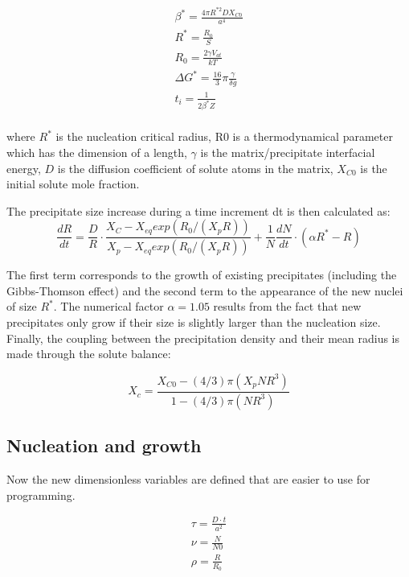 \documentclass[12pt,a4paper]{article}
\begin{document}
\begin{subequations}
	\begin{align}
\beta^* = \frac{4\pi R^{*2} D X_{C0}}{a^4} \\
R^* = \frac{R_0}{S} \\
R_0 = \frac{2\gamma V_{at}}{kT} \\
\Delta G^* = \frac{16}{3}\pi \frac{\gamma}{\delta g} \\
t_i = \frac{1}{2\beta^* Z} \\
	\end{align}	
\end{subequations}

where $R^*$ is the nucleation critical radius, R0 is a thermodynamical parameter
which has the dimension of a length, $\gamma$ is the matrix/precipitate interfacial energy, $D$ is the diffusion coefficient of solute atoms in the matrix, $X_{C0}$ is the initial solute mole fraction.

The precipitate size increase during a time increment dt is then calculated as:
\begin{equation}
\label{P_radius}
\frac{dR}{dt} = \frac{D}{R} \cdot \frac{X_C - X_{eq} exp(R_0/(X_pR))}{X_p - X_{eq} exp(R_0/(X_pR))} + \frac{1}{N}\frac{dN}{dt} \cdot (\alpha R^* - R)
\end{equation}

The first term corresponds to the growth of existing precipitates (including the Gibbs-Thomson effect) and the second term to the appearance of the new nuclei of
size $R^*$. The numerical factor $\alpha = 1.05$ results from the fact that new precipitates only grow if their size is slightly larger than the nucleation size. 
Finally, the coupling between the precipitation density and their mean radius is made through the solute balance:

\begin{equation}
X_c = \frac{X_{C0}-(4/3)\pi (X_pNR^3)}{1-(4/3)\pi (NR^3)}
\end{equation}

\subsection{Nucleation and growth}
Now the new dimensionless variables are defined that are easier to use for programming.

\begin{subequations}
	\begin{align}
\tau = \frac{D\cdot t}{a^2} \\
\nu = \frac{N}{N0} \\
\rho = \frac{R}{R_0}\\
	\end{align}
\end{subequations}
\end{document}
